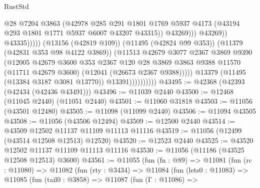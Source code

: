 \begin{lexlean}{RustStd}
\begin{coremodule}
                                              @28
                                              @7204
                                              @3863
                                              (@42978
                                                @285
                                                @291
                                                @1801
                                                @1769
                                                @5937
                                                @4173
                                                (@43194 @293 @1801 @1771 @5937 @6007 @43207 @43315))
                                              @43269)))
                                        @43269))
                                    @43335)))))
                          (@13156 (@42819 @109))
                          (@11495 (@42824 @99 @353))
                          (@11379 (@42831 @353 @98 @4122 @3869))
                          (@11513
                            @42679
                            @3077
                            @2367
                            @3869
                            @9390
                            (@12005
                              @42679
                              @3600
                              @353
                              @2367
                              @120
                              @28
                              @3869
                              @3863
                              @9388
                              @11570
                              (@11711 @42679 @3600)
                              (@12041 (@26673 @2367 @9388)))))
                        @13379
                        (@11495 (@13384 @3187 @3081 @13770))
                        @13391))))))))))
@43495 := @42368 (@42393 (@42434 (@42436 @43491)))
@43496 := @11039 @2440
@43500 := @12468 (@11045 @2440) (@11051 @2440)
@43501 := @11060 @31818
@43503 := @11056 (@43501 @12480)
@43505 := @11098 (@11099 @2440)
@43506 := @11094 @43505
@43508 := @11056 (@43506 @12494)
@43509 := @12500 @2440
@43514 := @43509 @12502 @11137 @11109 @11113 @11116
@43519 := @11056 (@12499 (@43514 @12508 @12513) @12520)
@43520 := @12523 @2440
@43525 := @43520 @12502 @11137 @11109 @11113 @11116
@43530 := @11056 (@11186 (@43525 @12508 @12513) @3600)
@43561 := @11055
    (fun (fn : @89) =>
    @11081
      (fun (rc : @11080) =>
      @11082
        (fun (rty : @3434) =>
        @11084
          (fun (lets0 : @11083) =>
          @11085
            (fun (tail0 : @3858) =>
            @11087
              (fun (Γ : @11086) =>

\end{coremodule}
\end{lexlean}
